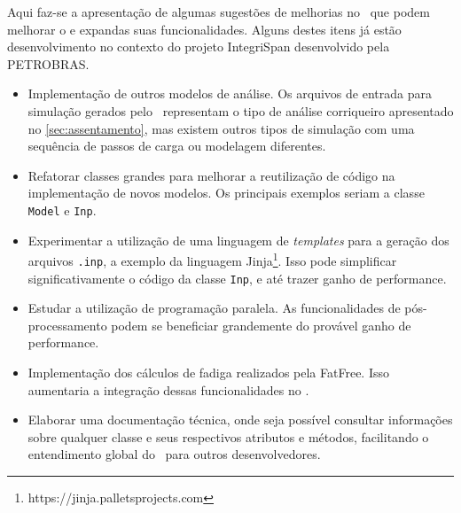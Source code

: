 Aqui faz-se a apresentação de algumas sugestões de melhorias no \frame\ que podem melhorar o e expandas suas funcionalidades. Alguns destes itens já estão desenvolvimento no contexto do projeto IntegriSpan desenvolvido pela PETROBRAS.

\begin{itemize}
    \item Implementação de outros modelos de análise. Os arquivos de entrada para simulação gerados pelo \frame\ representam o tipo de análise corriqueiro apresentado no \autoref{sec:assentamento}, mas existem outros tipos de simulação com uma sequência de passos de carga ou modelagem diferentes.
    \item Refatorar classes grandes para melhorar a reutilização de código na implementação de novos modelos. Os principais exemplos seriam a classe \texttt{Model} e \texttt{Inp}.
    \item Experimentar a utilização de uma linguagem de \textit{templates} para a geração dos arquivos \texttt{.inp}, a exemplo da linguagem Jinja\footnote{https://jinja.palletsprojects.com}. Isso pode simplificar significativamente o código da classe \texttt{Inp}, e até trazer ganho de performance.
    \item Estudar a utilização de programação paralela. As funcionalidades de pós-processamento podem se beneficiar grandemente do provável ganho de performance.
    \item Implementação dos cálculos de fadiga realizados pela FatFree. Isso aumentaria a integração dessas funcionalidades no \frame.
    \item Elaborar uma documentação técnica, onde seja possível consultar informações sobre qualquer classe e seus respectivos atributos e métodos, facilitando o entendimento global do \frame\ para outros desenvolvedores.
\end{itemize}
